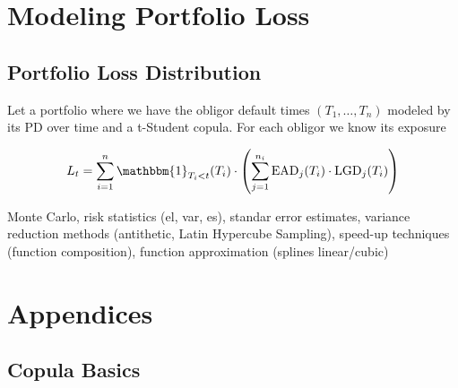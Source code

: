 \documentclass[11pt,fleqn]{book} %
\begin{document}
\begin{example}
\end{example}


\chapter{Modeling Portfolio Loss}

\section{Portfolio Loss Distribution}

Let a portfolio where we have the obligor default times
$(T_1,\dots,T_n)$ modeled by its PD over time and a
t-Student copula. For each obligor we know its exposure

\begin{displaymath}
    L_t = \displaystyle \sum_{i=1}^n \mathbbm{1}_{T_i < t}(T_i) \cdot 
    \left( 
    \sum_{j=1}^{n_i} \text{EAD}_j(T_i) \cdot \text{LGD}_j(T_i)
    \right)
\end{displaymath}

Monte Carlo, risk statistics (el, var, es), standar error estimates,
variance reduction methods (antithetic, Latin Hypercube Sampling),
speed-up techniques (function composition), function approximation
(splines linear/cubic)


\appendix
{}
\chapter{Appendices}

\section{Copula Basics}
\label{ap:copula_basics}
\end{document}
